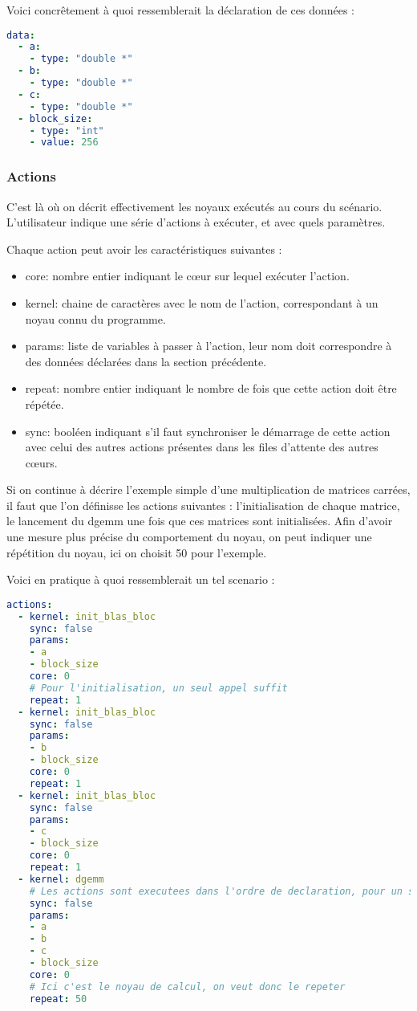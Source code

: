 Voici concrêtement à quoi ressemblerait la déclaration de ces données :

\begin{lstlisting}[language=yaml,caption=Exemple de déclaration de variables,label=lst:tool:data-example]
data:
  - a:
    - type: "double *"
  - b:
    - type: "double *"
  - c:
    - type: "double *"
  - block_size:
    - type: "int"
    - value: 256
\end{lstlisting}

\subsubsection{Actions}

C'est là où on décrit effectivement les noyaux exécutés au cours du scénario.
L'utilisateur indique une série d'actions à exécuter, et avec quels paramètres.

Chaque action peut avoir les caractéristiques suivantes :
\begin{itemize}
  \item core: nombre entier indiquant le cœur sur lequel exécuter l'action.
  \item kernel: chaine de caractères avec le nom de l'action, correspondant à un noyau connu du programme.
  \item params: liste de variables à passer à l'action, leur nom doit correspondre à des données déclarées dans la section précédente.
  \item repeat: nombre entier indiquant le nombre de fois que cette action doit être répétée.
  \item sync: booléen indiquant s'il faut synchroniser le démarrage de cette action avec celui des autres actions présentes dans les files d'attente des autres cœurs.
\end{itemize}

Si on continue à décrire l'exemple simple d'une multiplication de matrices carrées, il faut que l'on définisse les actions suivantes : l'initialisation de chaque matrice, le lancement du dgemm une fois que ces matrices sont initialisées.
Afin d'avoir une mesure plus précise du comportement du noyau, on peut indiquer une répétition du noyau, ici on choisit 50 pour l'exemple.

Voici en pratique à quoi ressemblerait un tel scenario :
\begin{lstlisting}[language=yaml,caption=Exemple de déclaration d'actions,label=lst:tool:actions-example]
actions:
  - kernel: init_blas_bloc
    sync: false
    params: 
    - a
    - block_size
    core: 0
    # Pour l'initialisation, un seul appel suffit
    repeat: 1
  - kernel: init_blas_bloc
    sync: false
    params: 
    - b
    - block_size
    core: 0
    repeat: 1
  - kernel: init_blas_bloc
    sync: false
    params: 
    - c
    - block_size
    core: 0
    repeat: 1
  - kernel: dgemm
    # Les actions sont executees dans l'ordre de declaration, pour un seul dgemm c'est inutile de synchroniser
    sync: false
    params: 
    - a
    - b
    - c
    - block_size
    core: 0
    # Ici c'est le noyau de calcul, on veut donc le repeter
    repeat: 50
\end{lstlisting}

